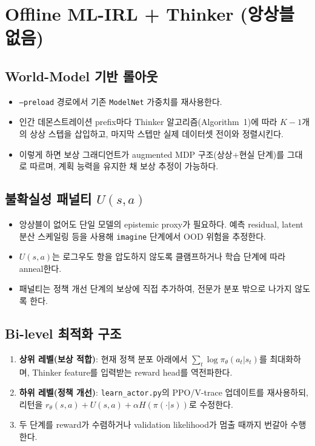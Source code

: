 \documentclass{article}
\begin{document}
\section{Offline ML-IRL + Thinker (앙상블 없음)}
\subsection{World-Model 기반 롤아웃}
\begin{itemize}
  \item \texttt{--preload} 경로에서 기존 \texttt{ModelNet} 가중치를 재사용한다.
  \item 인간 데몬스트레이션 prefix마다 Thinker 알고리즘(Algorithm~1)에 따라 $K-1$개의 상상 스텝을 삽입하고, 마지막 스텝만 실제 데이터셋 전이와 정렬시킨다.
  \item 이렇게 하면 보상 그래디언트가 augmented MDP 구조(상상+현실 단계)를 그대로 따르며, 계획 능력을 유지한 채 보상 추정이 가능하다.
\end{itemize}

\subsection{불확실성 패널티 $U(s,a)$}
\begin{itemize}
  \item 앙상블이 없어도 단일 모델의 epistemic proxy가 필요하다. 예측 residual, latent 분산 스케일링 등을 사용해 \texttt{imagine} 단계에서 OOD 위험을 추정한다.
  \item $U(s,a)$는 로그우도 항을 압도하지 않도록 클램프하거나 학습 단계에 따라 anneal한다.
  \item 패널티는 정책 개선 단계의 보상에 직접 추가하여, 전문가 분포 밖으로 나가지 않도록 한다.
\end{itemize}

\subsection{Bi-level 최적화 구조}
\begin{enumerate}
  \item \textbf{상위 레벨(보상 적합)}: 현재 정책 분포 아래에서 $\sum_t \log \pi_{\theta}(a_t|s_t)$를 최대화하며, Thinker feature를 입력받는 reward head를 역전파한다.
  \item \textbf{하위 레벨(정책 개선)}: \texttt{learn\_actor.py}의 PPO/V-trace 업데이트를 재사용하되, 리턴을 $r_{\theta}(s,a)+U(s,a)+\alpha H(\pi(\cdot|s))$로 수정한다.
  \item 두 단계를 reward가 수렴하거나 validation likelihood가 멈출 때까지 번갈아 수행한다.
\end{enumerate}
\end{document}
